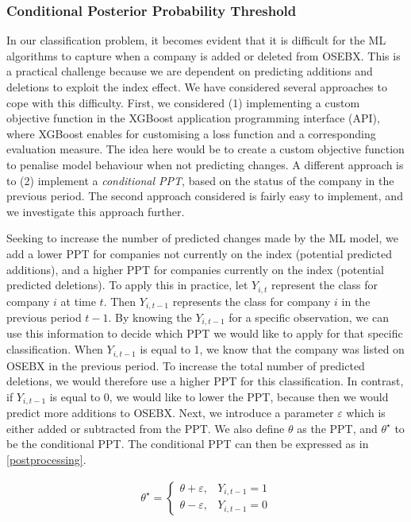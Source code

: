 \subsubsection{Conditional Posterior Probability Threshold}

In our classification problem, it becomes evident that it is difficult for the ML algorithms to capture when a company is added or deleted from OSEBX. This is a practical challenge because we are dependent on predicting additions and deletions to exploit the index effect. We have considered several approaches to cope with this difficulty. First, we considered (1) implementing a custom objective function in the XGBoost application programming interface (API), where XGBoost enables for customising a loss function and a corresponding evaluation measure. The idea here would be to create a custom objective function to penalise model behaviour when not predicting changes. A different approach is to (2) implement a \textit{conditional PPT}, based on the status of the company in the previous period. The second approach considered is fairly easy to implement, and we investigate this approach further.

Seeking to increase the number of predicted changes made by the ML model, we add a lower PPT for companies not currently on the index (potential predicted additions), and a higher PPT for companies currently on the index (potential predicted deletions). To apply this in practice, let $Y_{i,t}$ represent the class for company $i$ at time $t$. Then $Y_{i,t-1}$ represents the class for company $i$ in the previous period $t-1$. By knowing the $Y_{i,t-1}$ for a specific observation, we can use this information to decide which PPT we would like to apply for that specific classification. When $Y_{i,t-1}$ is equal to 1, we know that the company was listed on OSEBX in the previous period. To increase the total number of predicted deletions, we would therefore use a higher PPT for this classification. In contrast, if $Y_{i,t-1}$ is equal to 0, we would like to lower the PPT, because then we would predict more additions to OSEBX. Next, we introduce a parameter $\varepsilon$ which is either added or subtracted from the PPT. We also define $\theta$ as the PPT, and $\theta^\star$ to be the conditional PPT. The conditional PPT can then be expressed as in \autoref{postprocessing}. 

\vspace{-1em}
\begin{equation}
\begin{aligned}
    \theta^\star = \begin{cases}
    \theta + \varepsilon, &  Y_{i, t-1} = 1 \\
    \theta - \varepsilon, &  Y_{i, t-1} = 0
    \end{cases}
\label{postprocessing}
\end{aligned}
\end{equation}

